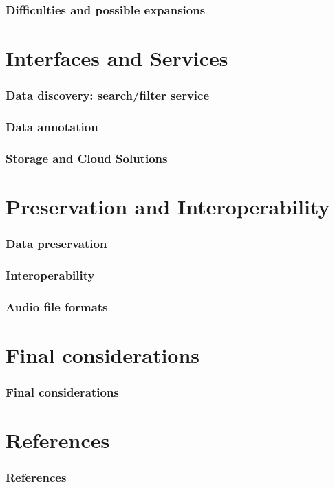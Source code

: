 \documentclass{beamer}
\begin{document}
  \begin{frame}
    \frametitle{Difficulties and possible expansions}
  \end{frame}



\section{Interfaces and Services}

  \begin{frame}
    \frametitle{Data discovery: search/filter service}
  \end{frame}



  \begin{frame}
    \frametitle{Data annotation}
  \end{frame}



  \begin{frame}
    \frametitle{Storage and Cloud Solutions}
  \end{frame}



\section{Preservation and Interoperability}

  \begin{frame}
    \frametitle{Data preservation}
  \end{frame}


  
  \begin{frame}
    \frametitle{Interoperability}
  \end{frame}

  

  \begin{frame}
    \frametitle{Audio file formats}
  \end{frame}

  

\section{Final considerations}

  \begin{frame}
    \frametitle{Final considerations}
  \end{frame}



\backupbegin

\section{References}

  \begin{frame}
    \frametitle{References}
  \end{frame}

\backupend
\end{document}
